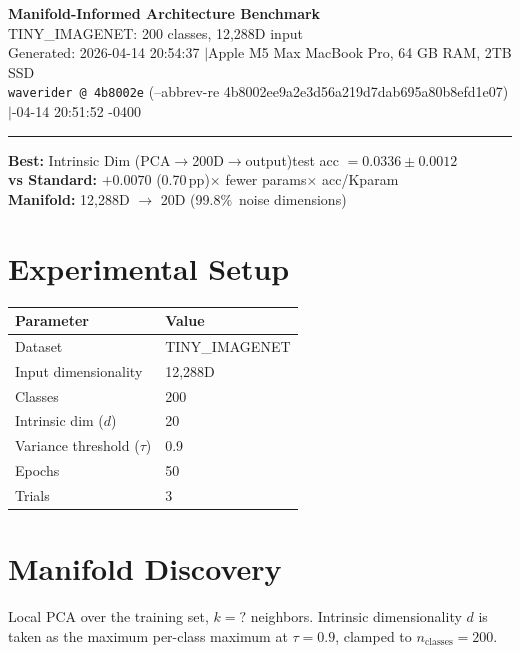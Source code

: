 \documentclass[11pt,letterpaper]{article}
\begin{document}
\begin{center}
  {\LARGE\bfseries\color{wavblue} Manifold-Informed Architecture Benchmark}\\[6pt]
  {\large TINY\_IMAGENET: 200 classes, 12,288D input}\\[8pt]
  {\small Generated: 2026-04-14 20:54:37 \quad$|$\quad Apple M5 Max MacBook Pro, 64 GB RAM, 2TB SSD}\\[2pt]
  {\small\texttt{waverider @ 4b8002e} (--abbrev-re
4b8002ee9a2e3d56a219d7dab695a80b8efd1e07) \quad$|$-04-14 20:51:52 -0400}
\end{center}
{\color{wavblue}\noindent\rule{\linewidth}{1.5pt}}
\medskip

\noindent\colorbox{wavlight}{\parbox{\dimexpr\linewidth-2\fboxsep\relax}{
  \smallskip
  \textbf{Best:} Intrinsic Dim (PCA$\rightarrow$200D$\rightarrow$output)\quad test acc $= 0.0336 \pm 0.0012$\\[2pt]
  \textbf{vs Standard:} $+0.0070$ (0.70\,pp)$\times$ fewer params$\times$ acc/Kparam\\[2pt]
  \textbf{Manifold:} 12,288D $\rightarrow$ 20D (99.8\%\ noise dimensions)\\[2pt]
  \smallskip
}}
\bigskip

\section{Experimental Setup}

\begin{tabular}{@{}ll@{}}
\toprule
\textbf{Parameter} & \textbf{Value} \\
\midrule
  Dataset & TINY\_IMAGENET \\
  Input dimensionality & 12,288D \\
  Classes & 200 \\
  Intrinsic dim ($d$) & 20 \\
  Variance threshold ($\tau$) & 0.9 \\
  Epochs & 50 \\
  Trials & 3 \\
\bottomrule
\end{tabular}

\section{Manifold Discovery}

Local PCA over the training set, $k = ?$ neighbors. Intrinsic dimensionality $d$ is taken as the maximum per-class maximum at $\tau = 0.9$, clamped to $n_{\mathrm{classes}} = 200$.
\end{document}
